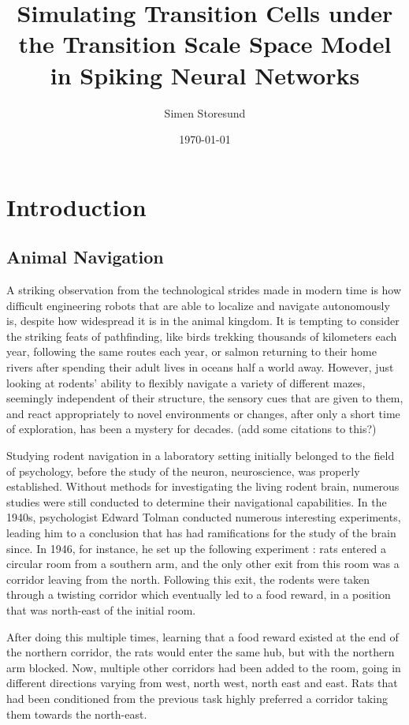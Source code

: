 \documentclass{article}
\title{Simulating Transition Cells under the Transition Scale Space Model in Spiking Neural Networks}
\author{Simen Storesund}
\date{\today}
\begin{document}
    \maketitle
    \newpage
    \tableofcontents
    \newpage
    \section{Introduction}
    \subsection{Animal Navigation} \label{Animal Navigation}
    A striking observation from the technological strides made in modern time is how difficult engineering robots that are able to localize and navigate autonomously is, despite how widespread it is in the animal kingdom. It is tempting to consider the striking feats of pathfinding, like birds trekking thousands of kilometers each year, following the same routes each year, or salmon returning to their home rivers after spending their adult lives in oceans half a world away. However, just looking at rodents' ability to flexibly navigate a variety of different mazes, seemingly independent of their structure, the sensory cues that are given to them, and react appropriately to novel environments or changes, after only a short time of exploration, has been a mystery for decades. (add some citations to this?)

    Studying rodent navigation in a laboratory setting initially belonged to the field of psychology, before the study of the neuron, neuroscience, was properly established. Without methods for investigating the living rodent brain, numerous studies were still conducted to determine their navigational capabilities. In the 1940s, psychologist Edward Tolman conducted numerous interesting experiments, leading him to a conclusion that has had ramifications for the study of the brain since. In 1946, for instance, he set up the following experiment \parencite{Tolman1946}: rats entered a circular room from a southern arm, and the only other exit from this room was a corridor leaving from the north. Following this exit, the rodents were taken through a twisting corridor which eventually led to a food reward, in a position that was north-east of the initial room.

    After doing this multiple times, learning that a food reward existed at the end of the northern corridor, the rats would enter the same hub, but with the northern arm blocked. Now, multiple other corridors had been added to the room, going in different directions varying from west, north west, north east and east. Rats that had been conditioned from the previous task highly preferred a corridor taking them towards the north-east.
\end{document}
